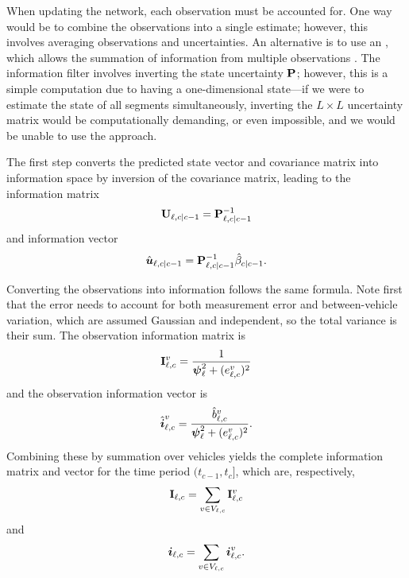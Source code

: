 When updating the network, each observation must be accounted for. One way would be to combine the observations into a single estimate; however, this involves averaging observations and uncertainties. An alternative is to use an \emph{\infil{}}, which allows the summation of information from multiple observations \citep{Mutambara_2000}. The information filter involves inverting the state uncertainty $\mathbf{P}$; however, this is a simple computation due to having a one-dimensional state---if we were to estimate the state of all segments simultaneously, inverting the $L\times L$ uncertainty matrix would be computationally demanding, or even impossible, and we would be unable to use the approach.



The first step converts the predicted state vector and covariance matrix into information space by inversion of the covariance matrix, leading to the information matrix
\begin{equation}\label{eq:nw_if_inf_matrix}
\mathbf{U}_{\ell,c|c-1} = \mathbf{P}_{\ell,c|c-1}^{-1}
\end{equation}
and information vector
\begin{equation}\label{eq:nw_if_inf_vector}
\hat{\boldsymbol{u}}_{\ell,c|c-1} = \mathbf{P}_{\ell,c|c-1}^{-1} \hat{\beta}_{c|c-1}.
\end{equation}


Converting the observations into information follows the same formula. Note first that the error needs to account for both measurement error and between-vehicle variation, which are assumed Gaussian and independent, so the total variance is their sum. The observation information matrix is
\begin{equation}\label{eq:nw_if_inf_obsmatrix}
\mathbf{I}_{\ell,c}^v = \frac{1}{\mathbf{\boldsymbol{\psi}}_{\ell}^2 + (e_{\ell,c}^v)^2}
\end{equation}
and the observation information vector is
\begin{equation}\label{eq:nw_if_inf_obsvector}
\hat{\boldsymbol{i}}_{\ell,c}^v = \frac{\hat{b}_{\ell,c}^v}{
    \mathbf{\boldsymbol{\psi}}_{\ell}^2 + (e_{\ell,c}^v)^2
}.
\end{equation}
Combining these by summation over vehicles yields the complete information matrix and vector for the time period $(t_{c-1},t_c]$, which are, respectively,
\begin{equation}\label{eq:nw_if_obsupdate_matrix}
\mathbf{I}_{\ell,c} = \sum_{v\in V_{\ell,c}} \mathbf{I}_{\ell,c}^v
\end{equation}
and
\begin{equation}\label{eq:nw_if_obsupdate_vector}
\boldsymbol{i}_{\ell,c} = \sum_{v \in V_{\ell,c}} \boldsymbol{i}_{\ell,c}^v.
\end{equation}




